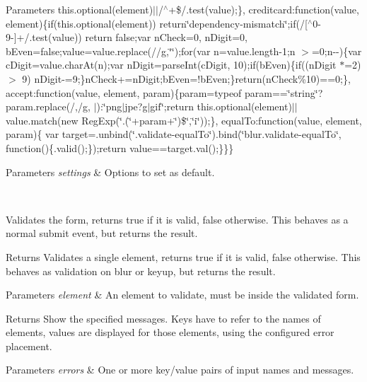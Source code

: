 {\begin{DoxyParams}{Parameters}
this.\+optional(element)$\vert$$\vert$/$^\wedge$+\$/.test(value);\}, creditcard\+:function(value, element)\{if(this.\+optional(element)) return\char`\"{}dependency-\/mismatch\char`\"{};if(/\mbox{[}$^\wedge$0-\/9-\/\mbox{]}+/.test(value)) return false;var n\+Check=0, n\+Digit=0, b\+Even=false;value=value.\+replace(//g,\char`\"{}\char`\"{});for(var n=value.\+length-\/1;n $>$=0;n-\/-\/)\{var c\+Digit=value.\+char\+At(n);var n\+Digit=parse\+Int(c\+Digit, 10);if(b\+Even)\{if((n\+Digit $\ast$=2) $>$ 9) n\+Digit-\/=9;\}n\+Check+=n\+Digit;b\+Even=!b\+Even;\}return(n\+Check\%10)==0;\}, accept\+:function(value, element, param)\{param=typeof param==\char`\"{}string\char`\"{}?param.\+replace(/,/g, \textquotesingle{}$\vert$\textquotesingle{})\+:\char`\"{}png$\vert$jpe?g$\vert$gif\char`\"{};return this.\+optional(element)$\vert$$\vert$value.match(new Reg\+Exp(\char`\"{}.(\char`\"{}+param+\char`\"{})\$\char`\"{},\char`\"{}i\char`\"{}));\}, equal\+To\+:function(value, element, param)\{ var target=.unbind(\char`\"{}.\+validate-\/equal\+To\char`\"{}).bind(\char`\"{}blur.\+validate-\/equal\+To\char`\"{}, function()\{.valid();\});return value==target.\+val();\}\}\} 
\begin{DoxyParams}{Parameters}
{\em settings} & Options to set as default. \\
\hline
\end{DoxyParams}
\\
\hline
\end{DoxyParams}
Validates the form, returns true if it is valid, false otherwise. This behaves as a normal submit event, but returns the result. 

\begin{DoxyReturn}{Returns}
Validates a single element, returns true if it is valid, false otherwise. This behaves as validation on blur or keyup, but returns the result. 
\end{DoxyReturn}

\begin{DoxyParams}{Parameters}
{\em element} & An element to validate, must be inside the validated form. \\
\hline
\end{DoxyParams}
\begin{DoxyReturn}{Returns}
Show the specified messages. Keys have to refer to the names of elements, values are displayed for those elements, using the configured error placement. 
\end{DoxyReturn}

\begin{DoxyParams}{Parameters}
{\em errors} & One or more key/value pairs of input names and messages. \\
\hline
\end{DoxyParams}


}
